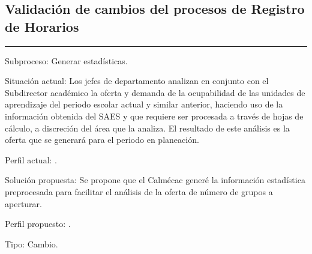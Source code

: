 \subsection{Validación de cambios del procesos de Registro de Horarios}
\label{sec:PF-RH:validacion}


\hrule
\vspace{0.2cm}
\begin{Cdescription}
	\item[Subproceso:] Generar estadísticas.
	\item[Situación actual:] Los jefes de departamento analizan en conjunto con el Subdirector académico la oferta y demanda de la ocupabilidad de las unidades de aprendizaje del periodo escolar actual y similar anterior, haciendo uso de la información obtenida del SAES y que requiere ser procesada a través de hojas de cálculo, a discreción del área que la analiza. El resultado de este análisis es la oferta que se generará para el periodo en planeación.
	\item[Perfil actual:] .
	\item[Solución propuesta:] Se propone que el Calmécac generé la información estadística preprocesada para facilitar el análisis de la oferta de número de grupos a aperturar.
	\item[Perfil propuesto:] .
	\item[Tipo:] Cambio.
\end{Cdescription}


